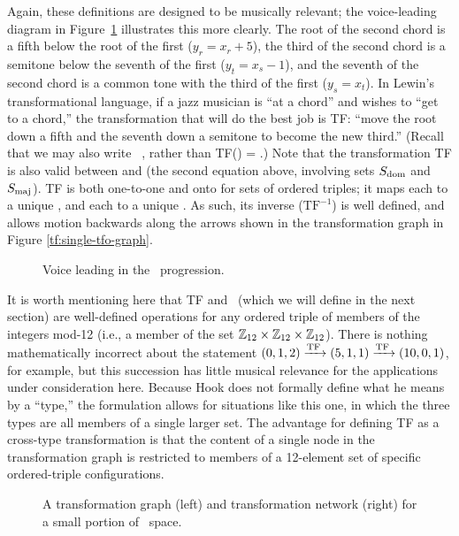 \noindent Again, these definitions are designed to be musically relevant; the
voice-leading diagram in Figure~\ref{tf:tfo-voice-leading} illustrates this
more clearly. The root of the second chord is a fifth below the root
of the first ($y_r = x_r + 5$), the third of the second chord is a semitone
below the seventh of the first ($y_t = x_s - 1$), and the seventh of the
second chord is a common tone with the third of the first ($y_s = x_t$). In
Lewin's transformational language, if a jazz musician is ``at a \ii
chord'' and wishes to ``get to a \V chord,'' the transformation that
will do the best job is TF: ``move the root down a fifth and the seventh down
a semitone to become the new third.'' (Recall that we may also write
\mbox{\ii \TFarrow\ \V}, rather than TF(\ii) = \V.) Note
that the transformation TF is also valid between \V and \I
(the second equation above, involving sets $S_{\mathrm{dom}}$ and $S_{\mathrm{maj}}$). TF is
both one-to-one and onto for sets of ordered triples; it maps each \ii
to a unique \V, and each \V to a unique \I. As such, its
inverse ($\mathrm{TF}^{-1}$) is well defined, and allows motion backwards
along the arrows shown in the transformation graph in Figure
\ref{tf:single-tfo-graph}.

\begin{figure}[htbp]
  \caption{Voice leading in the \tfo\ progression.}
  \label{tf:tfo-voice-leading}
\end{figure}

It is worth mentioning here that TF and \tft\ (which we will define in the
next section) are well-defined operations for any ordered triple of members of
the integers mod-12 (i.e., a member of the set $\mathbb{Z}_{12} \times \mathbb{Z}_{12}
\times \mathbb{Z}_{12}$). There is nothing mathematically incorrect
about the statement $(0, 1, 2) \xrightarrow{\mathrm{TF}\,} (5, 1, 1) \xrightarrow{\mathrm{TF}\,} (10, 0, 1)$, for
example, but this succession has little musical relevance for the applications
under consideration here. Because Hook does not formally define what he means
by a ``type,'' the formulation allows for situations like this one, in which
the three types are all members of a single larger set. The advantage
for defining TF as a cross-type transformation is that the content of a single
node in the transformation graph is restricted to members of a 12-element set
of specific ordered-triple configurations.

\begin{figure}[tbp]
  \caption[A transformation graph and network for a small portion of \tf\
    space]{A transformation graph (left) and transformation network (right)
    for a small portion of \tf\ space.}
  \label{tf:trans-graph-large}
\end{figure}

